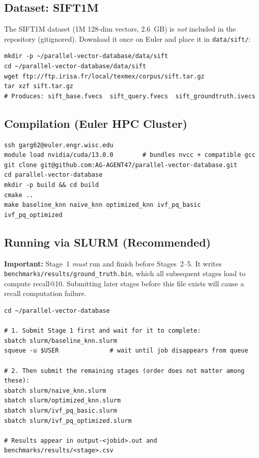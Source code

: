 \documentclass[12pt]{article}
\begin{document}
\subsection*{Dataset: SIFT1M}

The SIFT1M dataset (1M 128-dim vectors, 2.6~GB) is \emph{not} included in the
repository (gitignored). Download it once on Euler and place it in
\texttt{data/sift/}:

\begin{lstlisting}[style=terminal]
mkdir -p ~/parallel-vector-database/data/sift
cd ~/parallel-vector-database/data/sift
wget ftp://ftp.irisa.fr/local/texmex/corpus/sift.tar.gz
tar xzf sift.tar.gz
# Produces: sift_base.fvecs  sift_query.fvecs  sift_groundtruth.ivecs
\end{lstlisting}

\subsection*{Compilation (Euler HPC Cluster)}
\begin{lstlisting}[style=terminal]
ssh garg62@euler.engr.wisc.edu
module load nvidia/cuda/13.0.0        # bundles nvcc + compatible gcc
git clone git@github.com:AG-AGENT47/parallel-vector-database.git
cd parallel-vector-database
mkdir -p build && cd build
cmake ..
make baseline_knn naive_knn optimized_knn ivf_pq_basic ivf_pq_optimized
\end{lstlisting}

\subsection*{Running via SLURM (Recommended)}

\textbf{Important:} Stage~1 \emph{must} run and finish before Stages~2--5.
It writes \texttt{benchmarks/results/ground\_truth.bin}, which all subsequent
stages load to compute recall@10. Submitting later stages before this file
exists will cause a recall computation failure.

\begin{lstlisting}[style=terminal]
cd ~/parallel-vector-database

# 1. Submit Stage 1 first and wait for it to complete:
sbatch slurm/baseline_knn.slurm
squeue -u $USER              # wait until job disappears from queue

# 2. Then submit the remaining stages (order does not matter among these):
sbatch slurm/naive_knn.slurm
sbatch slurm/optimized_knn.slurm
sbatch slurm/ivf_pq_basic.slurm
sbatch slurm/ivf_pq_optimized.slurm

# Results appear in output-<jobid>.out and benchmarks/results/<stage>.csv
\end{lstlisting}
\end{document}
